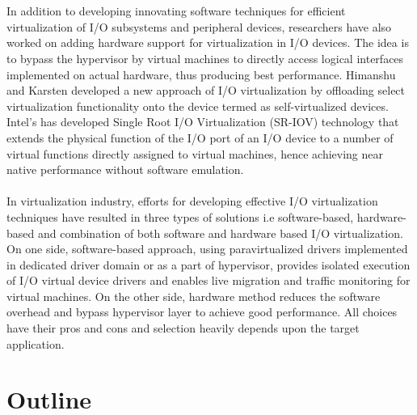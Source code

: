 \\
\\
In addition to developing innovating software techniques for efficient virtualization of I/O subsystems and peripheral devices, researchers have also worked on adding hardware support for virtualization in I/O devices. The idea is to bypass the hypervisor by virtual machines to directly access logical interfaces implemented on actual hardware, thus producing best performance. Himanshu and Karsten \cite{selfvirt} developed a new approach of I/O virtualization by  offloading select virtualization functionality onto the device termed as self-virtualized devices. Intel's has developed Single Root I/O Virtualization (SR-IOV) technology \cite{SRIOC} that extends the physical function of the I/O port of an I/O device to a number of virtual functions directly assigned to virtual machines, hence achieving near native performance without software emulation. 
\\
\\
In virtualization industry, efforts for developing effective I/O virtualization techniques have resulted in three types of solutions i.e software-based, hardware-based and combination of both software and hardware based I/O virtualization. On one side, software-based approach, using paravirtualized drivers implemented in dedicated driver domain or as a part of hypervisor, provides isolated execution of I/O virtual device drivers and enables live migration \cite{migration} and traffic monitoring \cite{monitoring} for virtual machines. On the other side, hardware method reduces the software overhead and bypass hypervisor layer to achieve good performance. All choices have their pros and cons and selection heavily depends upon the target application.

\section{Outline\label{sec:outline}}

